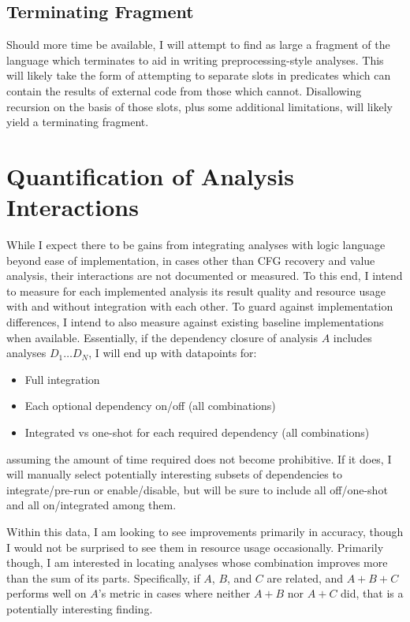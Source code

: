 \subsection{Terminating Fragment}
Should more time be available, I will attempt to find as large a fragment of the language which terminates to aid in writing preprocessing-style analyses.
This will likely take the form of attempting to separate slots in predicates which can contain the results of external code from those which cannot.
Disallowing recursion on the basis of those slots, plus some additional limitations, will likely yield a terminating fragment.

\section{Quantification of Analysis Interactions}
While I expect there to be gains from integrating analyses with logic language beyond ease of implementation, in cases other than CFG recovery and value analysis,\cite{jakstab} their interactions are not documented or measured.
To this end, I intend to measure for each implemented analysis its result quality and resource usage with and without integration with each other.
To guard against implementation differences, I intend to also measure against existing baseline implementations when available.
Essentially, if the dependency closure of analysis $A$ includes analyses $D_1 \ldots D_N$, I will  end up with datapoints for:
\begin{itemize}
        \item Full integration
        \item Each optional dependency on/off (all combinations)
        \item Integrated vs one-shot for each required dependency (all combinations)
\end{itemize}
assuming the amount of time required does not become prohibitive.
If it does, I will manually select potentially interesting subsets of dependencies to integrate/pre-run or enable/disable, but will be sure to include all off/one-shot and all on/integrated among them.

Within this data, I am looking to see improvements primarily in accuracy, though I would not be surprised to see them in resource usage occasionally.
Primarily though, I am interested in locating analyses whose combination improves more than the sum of its parts.
Specifically, if $A$, $B$, and $C$ are related, and $A + B + C$ performs well on $A$'s metric in cases where neither $A + B$ nor $A + C$ did, that is a potentially interesting finding.
